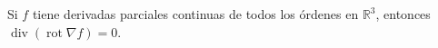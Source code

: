 \item Si $f$ tiene derivadas parciales continuas de todos los órdenes en $\mathbb{R}^3$, entonces $\operatorname{div}(\operatorname{rot} \nabla f) = 0$.
